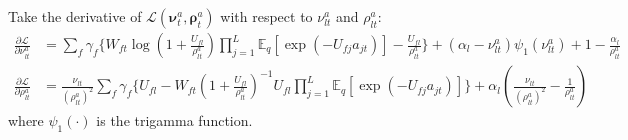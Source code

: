 \documentclass{article} %
\begin{document}
Take the derivative of $\mathcal{L}(\bm{\nu}^a_t, \bm{\rho}^a_t)$ with respect to $\nu_{lt}^a$ and $\rho_{lt}^a$:
\begin{align}
\frac{\partial \mathcal{L}}{\partial \nu_{lt}^a} &= \sum_f \gamma_f \biggl\{ W_{ft}  \log(1 + \frac{U_{fl}}{\rho^a_{lt}}) \prod_{j=1}^L \mathbb{E}_q [\exp(-U_{fj} a_{jt} )] \nonumber -\frac{U_{fl}}{\rho_{lt}^a} \biggl\} + (\alpha_l - \nu_{lt}^a) \psi_1(\nu_{lt}^a) + 1 - \frac{\alpha_l}{\rho^a_{lt}}
\end{align}
\begin{align}
\frac{\partial \mathcal{L}}{\partial \rho_{lt}^a} &= \frac{\nu_{lt}}{(\rho_{lt}^a)^2} \sum_f \gamma_f \biggl\{U_{fl} -W_{ft} (1 + \frac{U_{fl}}{\rho_{lt}^a})^{-1} U_{fl} \nonumber \prod_{j=1}^L \mathbb{E}_q [\exp(- U_{fj} a_{jt} )] \biggl\} + \alpha_l (\frac{\nu_{lt}}{(\rho_{lt}^a)^2} - \frac{1}{\rho_{lt}^a})
\end{align}
where $\psi_1(\cdot)$ is the trigamma function. 
\end{document}
